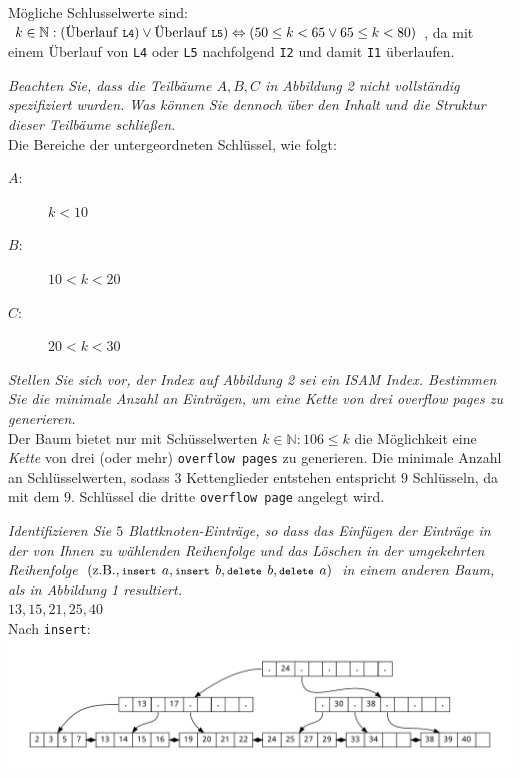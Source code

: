 \documentclass{uni_tue_template}
\newcommand{\set}[1]{\mathbb{#1}}
\newcommand{\code}[1]{\texttt{{\footnotesize #1}}}
\begin{document}
  Mögliche Schlusselwerte sind:\\$k \in \set{N}: (\text{Überlauf \code{L4}}) \lor \text{Überlauf \code{L5}}) \Leftrightarrow (50 \leq k < 65 \lor 65 \leq k < 80)$, da mit einem Überlauf von \code{L4} oder \code{L5} nachfolgend \code{I2} und damit \code{I1} überlaufen.
  \item \emph{Beachten Sie, dass die Teilbäume $A, B, C$ in Abbildung 2 nicht vollständig spezifiziert wurden. Was können Sie dennoch über den Inhalt und die Struktur dieser Teilbäume schließen.}\\
  Die Bereiche der untergeordneten Schlüssel, wie folgt:
  \begin{description}
    \item[$A:$] $k < 10$
    \item[$B:$] $10 < k < 20$
    \item[$C:$] $20 < k < 30$
  \end{description}
  \item \emph{Stellen Sie sich vor, der Index auf Abbildung 2 sei ein ISAM Index. Bestimmen Sie die minimale Anzahl an Einträgen, um eine Kette von drei \emph{overflow pages} zu generieren.}\\
  Der Baum bietet nur mit Schüsselwerten $k \in \set{N}: 106 \leq k$ die Möglichkeit eine \emph{Kette} von drei (oder mehr) \code{overflow pages} zu generieren. Die minimale Anzahl an Schlüsselwerten, sodass $3$ Kettenglieder entstehen entspricht $9$ Schlüsseln, da mit dem $9.$ Schlüssel die dritte \code{overflow page} angelegt wird.
\subExEnd{}
%
\newpage 
%
\exercise{}
  \item \emph{Identifizieren Sie $5$ Blattknoten-Einträge, so dass das Einfügen der Einträge in der von Ihnen zu wählenden Reihenfolge und das Löschen in der umgekehrten Reihenfolge $(\text{z.B.}, \code{insert } a, \code{insert } b, \code{delete } b, \code{delete } a)$ in einem anderen Baum, als in Abbildung 1 resultiert.}\\
  $13, 15, 21, 25, 40$\\
  Nach \code{insert}:\\
  \includegraphics[scale=0.4]{./dot/A3_1-1.pdf}\\
\end{document}
